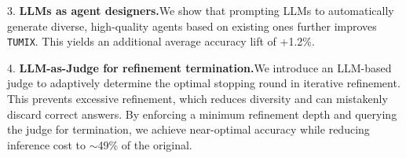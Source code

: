3. \textbf{LLMs as agent designers.}\quad We show that prompting LLMs to automatically generate diverse, high-quality agents based on existing ones further improves \texttt{TUMIX}. This yields an additional average accuracy lift of +1.2\%.

4. \textbf{LLM-as-Judge for refinement termination.}\quad We introduce an LLM-based judge to adaptively determine the optimal stopping round in iterative refinement. This prevents excessive refinement, which reduces diversity and can mistakenly discard correct answers. By enforcing a minimum refinement depth and querying the judge for termination, we achieve near-optimal accuracy while reducing inference cost to $\sim$49\% of the original.
